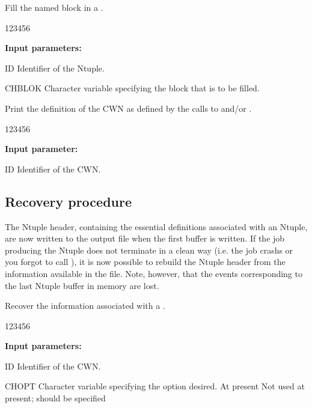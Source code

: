  
\Action Fill the named block  in a \CWN{}.
 
\begin{DLtt}{123456}
\item[{\rm\bf Input parameters:}]
\item[ID] Identifier of the Ntuple.
\item[CHBLOK]Character variable specifying the block that is to be filled.
\end{DLtt}

 
\Action Print the  definition of the CWN{}  as 
defined by the calls to  and/or .
 
\begin{DLtt}{123456}
\item[{\rm\bf Input parameter:}]
\item[ID] Identifier of the CWN{}.
\end{DLtt}

\subsection*{Recovery procedure}
\label{sec:Ntuple-recovery}

The Ntuple header, containing the essential
definitions associated with an Ntuple,
are now written to the output file when the first
buffer is written. 
If the job producing the Ntuple does not terminate in a clean way 
(i.e. the job crashs or you forgot to call ), 
it is now possible to rebuild the Ntuple header from the 
information available in the file.
Note, however, that the events corresponding to the last 
Ntuple buffer in memory are lost.


\Action Recover the information associated with a \CWN{}.
 
\begin{DLtt}{123456}
\item[{\rm\bf Input parameters:}]
\item[ID]    Identifier of the CWN{}.
\item[CHOPT] Character variable specifying the option desired.
             At present Not used at present; 
             should be specified
\end{DLtt}

\newpage%

